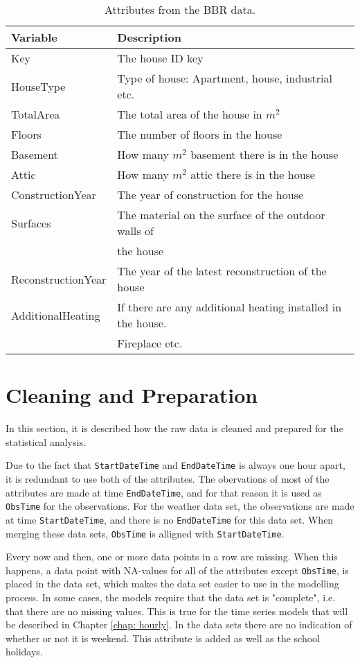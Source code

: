 \begin{table}[h]
    \centering
    \begin{tabular}{ll}
     \hline
     \textbf{Variable} & \textbf{Description} \\
    \hline
    \hline
    Key  &  The house ID key\\
    HouseType  &  Type of house: Apartment, house, industrial etc. \\
    TotalArea  & The total area of the house in $m^2$ \\
    Floors  & The number of floors in the house \\
    Basement  & How many $m^2$ basement there is in the house \\
    Attic  & How many $m^2$ attic there is in the house \\
    ConstructionYear  & The year of construction for the house  \\
    Surfaces  & The material on the surface of the outdoor walls of \\ & the house \\
    ReconstructionYear  & The year of the latest reconstruction of the house \\
    AdditionalHeating  & If there are any additional heating installed in the house. \\ & Fireplace etc. \\
    \hline
    \end{tabular}
    \caption{Attributes from the BBR data.}
    \label{tab: BBR}
\end{table}

\section{Cleaning and Preparation}
In this section, it is described how the raw data is cleaned and prepared for the statistical analysis.

\noindent Due to the fact that \texttt{StartDateTime} and \texttt{EndDateTime} is always one hour apart, it is redundant to use both of the attributes. The obervations of most of the attributes are made at time \texttt{EndDateTime}, and for that reason it is used as \texttt{ObsTime} for the observations. For the weather data set, the observations are made at time \texttt{StartDateTime}, and there is no \texttt{EndDateTime} for this data set. When merging these data sets, \texttt{ObsTime} is alligned with \texttt{StartDateTime}. 

\noindent Every now and then, one or more data points in a row are missing. When this happens, a data point with NA-values for all of the attributes except \texttt{ObsTime}, is placed in the data set, which makes the data set easier to use in the modelling process. In some cases, the models require that the data set is "complete", i.e. that there are no missing values. This is true for the time series models that will be described in Chapter \ref{chap: hourly}. In the data sets there are no indication of whether or not it is weekend. This attribute is added as well as the school holidays.


